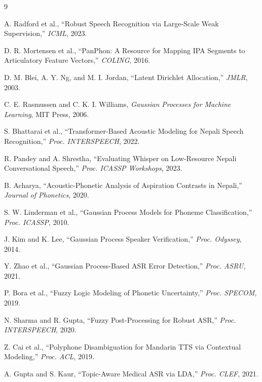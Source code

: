 \documentclass[10pt,conference]{IEEEtran}
\begin{document}

\begin{thebibliography}{9}

A. Radford et al., ``Robust Speech Recognition via Large-Scale Weak
Supervision,'' \emph{ICML}, 2023.

D. R. Mortensen et al., ``PanPhon: A Resource for Mapping IPA Segments
to Articulatory Feature Vectors,'' \emph{COLING}, 2016.

D. M. Blei, A. Y. Ng, and M. I. Jordan, ``Latent Dirichlet Allocation,''
\emph{JMLR}, 2003.

C. E. Rasmussen and C. K. I. Williams, \emph{Gaussian Processes for
Machine Learning}, MIT Press, 2006.

S. Bhattarai et al., ``Transformer-Based Acoustic Modeling for Nepali
Speech Recognition,'' \emph{Proc. INTERSPEECH}, 2022.

R. Pandey and A. Shrestha, ``Evaluating Whisper on Low-Resource Nepali
Conversational Speech,'' \emph{Proc. ICASSP Workshops}, 2023.

B. Acharya, ``Acoustic-Phonetic Analysis of Aspiration Contrasts in
Nepali,'' \emph{Journal of Phonetics}, 2020.

S. W. Linderman et al., ``Gaussian Process Models for Phoneme
Classification,'' \emph{Proc. ICASSP}, 2010.

J. Kim and K. Lee, ``Gaussian Process Speaker Verification,''
\emph{Proc. Odyssey}, 2014.

Y. Zhao et al., ``Gaussian Process-Based ASR Error Detection,''
\emph{Proc. ASRU}, 2021.

P. Bora et al., ``Fuzzy Logic Modeling of Phonetic Uncertainty,''
\emph{Proc. SPECOM}, 2019.

N. Sharma and R. Gupta, ``Fuzzy Post-Processing for Robust ASR,''
\emph{Proc. INTERSPEECH}, 2020.

Z. Cai et al., ``Polyphone Disambiguation for Mandarin TTS via
Contextual Modeling,'' \emph{Proc. ACL}, 2019.

A. Gupta and S. Kaur, ``Topic-Aware Medical ASR via LDA,'' \emph{Proc.
CLEF}, 2021.

\end{thebibliography}
\end{document}
